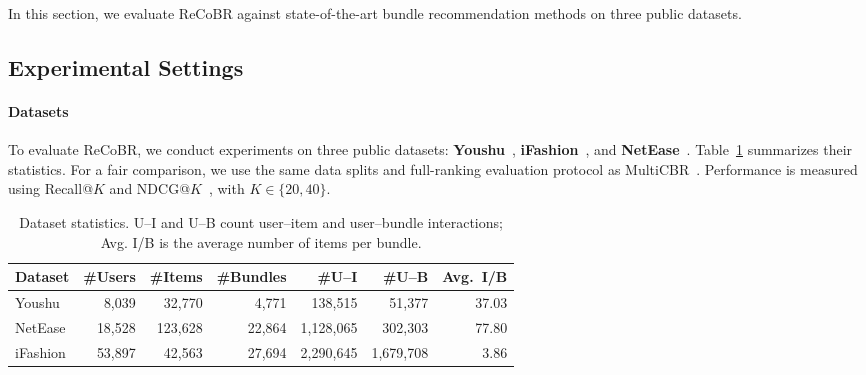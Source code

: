 \documentclass[letterpaper,journal]{IEEEtran}
\begin{document}
In this section, we evaluate ReCoBR against state-of-the-art bundle
recommendation methods on three public datasets.

\subsection{Experimental Settings}

\paragraph{Datasets}
To evaluate ReCoBR, we conduct experiments on three public
datasets: \textbf{Youshu}~\cite{chen2019dam},
\textbf{iFashion}~\cite{chen2019pog}, and
\textbf{NetEase}~\cite{cao2017efm}.
Table~\ref{tab:datasets} summarizes their statistics.
For a fair comparison, we use the same data splits and
full-ranking evaluation protocol as MultiCBR~\cite{ma2024multicbr}.
Performance is measured using Recall@$K$ and
NDCG@$K$~\cite{wang2019ngcf}, with $K\in\{20,40\}$.

\begin{table}[!htb]
    \centering
    \caption{Dataset statistics. U--I and U--B count user--item
    and user--bundle interactions; Avg. I/B is the average
    number of items per bundle.}
    \label{tab:datasets}
    {\small
    \setlength{\tabcolsep}{2pt}
    \begin{tabular}{@{}lrrrrrr@{}}
        \toprule
        Dataset
        & \#Users
        & \#Items
        & \#Bundles
        & \#U--I
        & \#U--B
        & Avg.~I/B \\
        \midrule
        Youshu
        & 8,039
        & 32,770
        & 4,771
        & 138,515
        & 51,377
        & 37.03 \\
        NetEase
        & 18,528
        & 123,628
        & 22,864
        & 1,128,065
        & 302,303
        & 77.80 \\
        iFashion
        & 53,897
        & 42,563
        & 27,694
        & 2,290,645
        & 1,679,708
        & 3.86 \\
        \bottomrule
    \end{tabular}
    }
\end{table}
\end{document}
